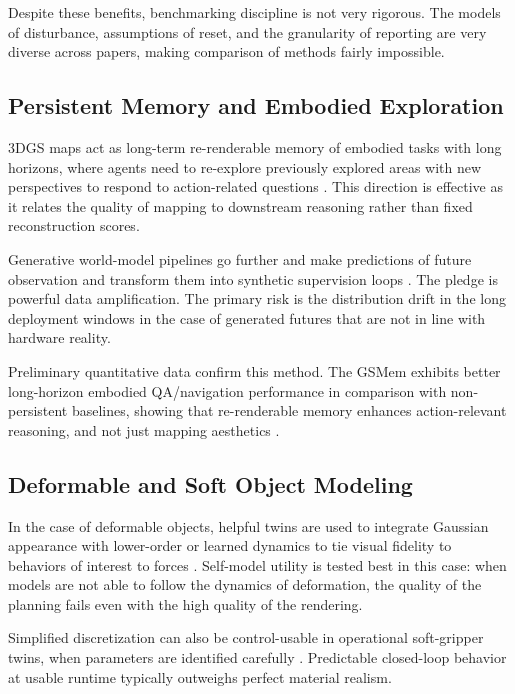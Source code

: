 \documentclass[11pt,a4paper]{article}
\begin{document}
Despite these benefits, benchmarking discipline is not very rigorous. The models of disturbance, assumptions of reset, and the granularity of reporting are very diverse across papers, making comparison of methods fairly impossible.

\subsection{Persistent Memory and Embodied Exploration}

3DGS maps act as long-term re-renderable memory of embodied tasks with long horizons, where agents need to re-explore previously explored areas with new perspectives to respond to action-related questions \cite{lu2025gsmem}. This direction is effective as it relates the quality of mapping to downstream reasoning rather than fixed reconstruction scores.

Generative world-model pipelines go further and make predictions of future observation and transform them into synthetic supervision loops \cite{huang2024enerverse}. The pledge is powerful data amplification. The primary risk is the distribution drift in the long deployment windows in the case of generated futures that are not in line with hardware reality.

Preliminary quantitative data confirm this method. The GSMem exhibits better long-horizon embodied QA/navigation performance in comparison with non-persistent baselines, showing that re-renderable memory enhances action-relevant reasoning, and not just mapping aesthetics \cite{lu2025gsmem}.

\subsection{Deformable and Soft Object Modeling}

In the case of deformable objects, helpful twins are used to integrate Gaussian appearance with lower-order or learned dynamics to tie visual fidelity to behaviors of interest to forces \cite{jiang2024phystwin,yao2026generalized}. Self-model utility is tested best in this case: when models are not able to follow the dynamics of deformation, the quality of the planning fails even with the high quality of the rendering.

Simplified discretization can also be control-usable in operational soft-gripper twins, when parameters are identified carefully \cite{hadi2021webots}. Predictable closed-loop behavior at usable runtime typically outweighs perfect material realism.
\end{document}
